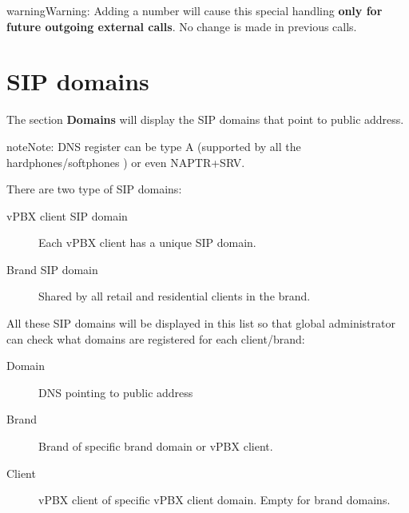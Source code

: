 \documentclass[letterpaper,10pt,english]{sphinxmanual}
\begin{document}
\begin{notice}{warning}{Warning:}
Adding a number will cause this special handling \textbf{only for future outgoing external calls}.
No change is made in previous calls.
\end{notice}


\section{SIP domains}
\label{administration_portal/platform/sip_domains:sip-domains}\label{administration_portal/platform/sip_domains::doc}\label{administration_portal/platform/sip_domains:god-sipdomains}
The section \textbf{Domains} will display the SIP domains that point to {\hyperref[administration_portal/platform/infrastructure/proxy_users:proxyusers]{}} public address.

\begin{notice}{note}{Note:}
DNS register can be type A (supported by all the hardphones/softphones
) or even NAPTR+SRV.
\end{notice}

There are two type of SIP domains:
\begin{description}
\item[{vPBX client SIP domain}] \leavevmode{}\label{administration_portal/platform/sip_domains:term-vpbx-client-sip-domain}
Each vPBX client has a unique SIP domain.

\item[{Brand SIP domain}] \leavevmode{}\label{administration_portal/platform/sip_domains:term-brand-sip-domain}
Shared by all retail and residential clients in the brand.

\end{description}

All these SIP domains will be displayed in this list so that global administrator can check
what domains are registered for each client/brand:
\begin{description}
\item[{Domain}] \leavevmode{}\label{administration_portal/platform/sip_domains:term-domain}
DNS pointing to {\hyperref[administration_portal/platform/infrastructure/proxy_users:proxyusers]{}} public address

\item[{Brand}] \leavevmode{}\label{administration_portal/platform/sip_domains:term-brand}
Brand of specific brand domain or vPBX client.

\item[{Client}] \leavevmode{}\label{administration_portal/platform/sip_domains:term-client}
vPBX client of specific vPBX client domain. Empty for brand domains.

\end{description}
\end{document}
